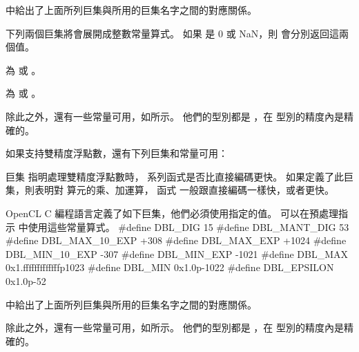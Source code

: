 中給出了上面所列巨集與所用的巨集名字之間的對應關係。

{}

下列兩個巨集將會展開成整數常量算式。
如果  是 0 或 NaN，則  會分別返回這兩個值。
\startigBase
\item {} 為  或 。
\item {} 為  或 。
\stopigBase

除此之外，還有一些常量可用，如所示。
他們的型別都是 ，在  型別的精度內是精確的。

{}

如果支持雙精度浮點數，還有下列巨集和常量可用：
\startigBase
\item 巨集  指明處理雙精度浮點數時，
  系列函式是否比直接編碼更快。
如果定義了此巨集，則表明對  算元的乘、加運算，
函式  一般跟直接編碼一樣快，或者更快。
\stopigBase

OpenCL C 編程語言定義了如下巨集，他們必須使用指定的值。
可以在預處理指示  中使用這些常量算式。
\startclc
#define DBL_DIG		15
#define DBL_MANT_DIG	53
#define DBL_MAX_10_EXP	+308
#define DBL_MAX_EXP	+1024
#define DBL_MIN_10_EXP	-307
#define DBL_MIN_EXP	-1021
#define DBL_MAX		0x1.fffffffffffffp1023
#define DBL_MIN		0x1.0p-1022
#define DBL_EPSILON	0x1.0p-52
\stopclc

中給出了上面所列巨集與所用的巨集名字之間的對應關係。

{}

除此之外，還有一些常量可用，如所示。
他們的型別都是 ，在  型別的精度內是精確的。

{}


